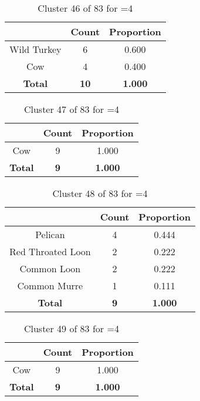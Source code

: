 \begin{table}[ht!]
\centering
\begin{tabular}{|c|c|c|}
\hline
\bf \Spec{} &\bf Count &\bf Proportion\\ \hline \hline
Wild Turkey & 6 & 0.600\\ \hline
Cow & 4 & 0.400\\ \hline
\hline
\bf Total & \bf 10 & \bf 1.000\\ \hline
\end{tabular}
\label{tab:cluster:46:4}
\caption{Cluster 46 of 83 for \minneigh{}=4}
\end{table}

\begin{table}[ht!]
\centering
\begin{tabular}{|c|c|c|}
\hline
\bf \Spec{} &\bf Count &\bf Proportion\\ \hline \hline
Cow & 9 & 1.000\\ \hline
\hline
\bf Total & \bf 9 & \bf 1.000\\ \hline
\end{tabular}
\label{tab:cluster:47:4}
\caption{Cluster 47 of 83 for \minneigh{}=4}
\end{table}

\begin{table}[ht!]
\centering
\begin{tabular}{|c|c|c|}
\hline
\bf \Spec{} &\bf Count &\bf Proportion\\ \hline \hline
Pelican & 4 & 0.444\\ \hline
Red Throated Loon & 2 & 0.222\\ \hline
Common Loon & 2 & 0.222\\ \hline
Common Murre & 1 & 0.111\\ \hline
\hline
\bf Total & \bf 9 & \bf 1.000\\ \hline
\end{tabular}
\label{tab:cluster:48:4}
\caption{Cluster 48 of 83 for \minneigh{}=4}
\end{table}

\begin{table}[ht!]
\centering
\begin{tabular}{|c|c|c|}
\hline
\bf \Spec{} &\bf Count &\bf Proportion\\ \hline \hline
Cow & 9 & 1.000\\ \hline
\hline
\bf Total & \bf 9 & \bf 1.000\\ \hline
\end{tabular}
\label{tab:cluster:49:4}
\caption{Cluster 49 of 83 for \minneigh{}=4}
\end{table}

